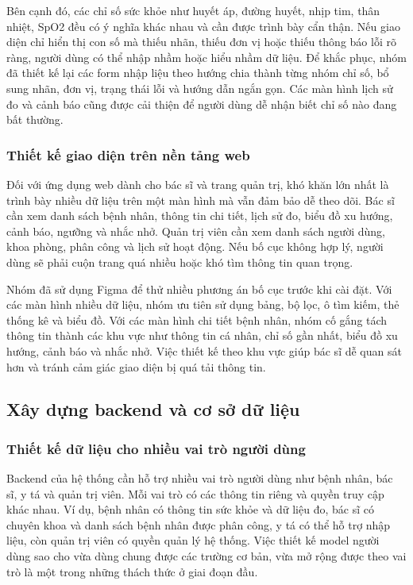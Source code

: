 \par Bên cạnh đó, các chỉ số sức khỏe như huyết áp, đường huyết, nhịp tim, thân nhiệt, SpO2 đều có ý nghĩa khác nhau và cần được trình bày cẩn thận. Nếu giao diện chỉ hiển thị con số mà thiếu nhãn, thiếu đơn vị hoặc thiếu thông báo lỗi rõ ràng, người dùng có thể nhập nhầm hoặc hiểu nhầm dữ liệu. Để khắc phục, nhóm đã thiết kế lại các form nhập liệu theo hướng chia thành từng nhóm chỉ số, bổ sung nhãn, đơn vị, trạng thái lỗi và hướng dẫn ngắn gọn. Các màn hình lịch sử đo và cảnh báo cũng được cải thiện để người dùng dễ nhận biết chỉ số nào đang bất thường.

\subsubsection{Thiết kế giao diện trên nền tảng web}
\par Đối với ứng dụng web dành cho bác sĩ và trang quản trị, khó khăn lớn nhất là trình bày nhiều dữ liệu trên một màn hình mà vẫn đảm bảo dễ theo dõi. Bác sĩ cần xem danh sách bệnh nhân, thông tin chi tiết, lịch sử đo, biểu đồ xu hướng, cảnh báo, ngưỡng và nhắc nhở. Quản trị viên cần xem danh sách người dùng, khoa phòng, phân công và lịch sử hoạt động. Nếu bố cục không hợp lý, người dùng sẽ phải cuộn trang quá nhiều hoặc khó tìm thông tin quan trọng.

\par Nhóm đã sử dụng Figma để thử nhiều phương án bố cục trước khi cài đặt. Với các màn hình nhiều dữ liệu, nhóm ưu tiên sử dụng bảng, bộ lọc, ô tìm kiếm, thẻ thống kê và biểu đồ. Với các màn hình chi tiết bệnh nhân, nhóm cố gắng tách thông tin thành các khu vực như thông tin cá nhân, chỉ số gần nhất, biểu đồ xu hướng, cảnh báo và nhắc nhở. Việc thiết kế theo khu vực giúp bác sĩ dễ quan sát hơn và tránh cảm giác giao diện bị quá tải thông tin.

\subsection{Xây dựng backend và cơ sở dữ liệu}

\subsubsection{Thiết kế dữ liệu cho nhiều vai trò người dùng}
\par Backend của hệ thống cần hỗ trợ nhiều vai trò người dùng như bệnh nhân, bác sĩ, y tá và quản trị viên. Mỗi vai trò có các thông tin riêng và quyền truy cập khác nhau. Ví dụ, bệnh nhân có thông tin sức khỏe và dữ liệu đo, bác sĩ có chuyên khoa và danh sách bệnh nhân được phân công, y tá có thể hỗ trợ nhập liệu, còn quản trị viên có quyền quản lý hệ thống. Việc thiết kế model người dùng sao cho vừa dùng chung được các trường cơ bản, vừa mở rộng được theo vai trò là một trong những thách thức ở giai đoạn đầu.

